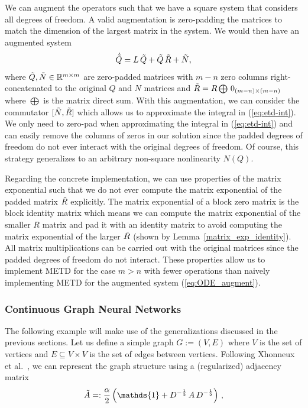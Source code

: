 \documentclass[12pt]{article}
\begin{document}
We can augment the operators such that we have a square system that considers all degrees of freedom. A valid augmentation is zero-padding the matrices to match the dimension of the largest matrix in the system. We would then have an augmented system
\begin{equation}
    \label{eq:ODE_augment}
    \dot{ \Tilde{Q} } = L\, \Tilde{Q} + \Tilde{Q} \, \Tilde{R} + \Tilde{N},
\end{equation}
where $\Tilde{Q}, \Tilde{N} \in \mathbb{R}^{m \times m}$ are zero-padded matrices with $m-n$ zero columns right-con\-cate\-nated to the original $Q$ and $N$ matrices and  $ \Tilde{R} = R \bigoplus \, 0_{(m-n)\times(m-n)}$ where $\bigoplus$ is the matrix direct sum. With this augmentation, we can consider the commutator $[ \Tilde{N}, \Tilde{R}]$ which allows us to approximate the integral in (\ref{eq:etd-int}). We only need to zero-pad when approximating the integral in (\ref{eq:etd-int}) and can easily remove the columns of zeros in our solution since the padded degrees of freedom do not ever interact with the original degrees of freedom. Of course, this strategy generalizes to an arbitrary non-square nonlinearity $N(Q)$.

Regarding the concrete implementation, we can use properties of the matrix exponential such that we do not ever compute the matrix exponential of the padded matrix $\Tilde{R}$ explicitly. The matrix exponential of a block zero matrix is the block identity matrix which means we can compute the matrix exponential of the smaller $R$ matrix and pad it with an identity matrix to avoid computing the matrix exponential of the larger $\Tilde{R}$ (shown by Lemma~\ref{matrix_exp_identity}). All matrix multiplications can be carried out with the original matrices since the padded degrees of freedom do not interact. These properties allow us to implement METD for the case $m>n$ with fewer operations than naively implementing METD for the augmented system (\ref{eq:ODE_augment}). 

\subsubsection{Continuous Graph Neural Networks}
The following example will make use of the generalizations discussed in the previous sections. Let us define a simple graph $G := (V,E)$ where $V$ is the set of vertices and $E \subseteq V \times V$ is the set of edges between vertices. Following Xhonneux et al.~\cite{pmlr-v119-xhonneux20a}, we can represent the graph structure using a (regularized) adjacency matrix 
\begin{equation}
    \Tilde{A}=: \frac{\alpha}{2} \left( \mathds{1} + D^{-\frac{1}{2}}\, A \, D^{-\frac{1}{2}} \right)\,,
\end{equation}
\end{document}
